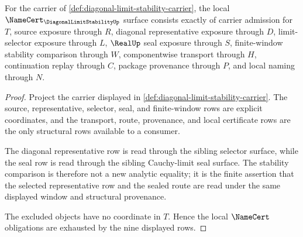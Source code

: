 \begin{theorem}
\label{thm:diagonal-limit-stability-namecert-obligations}
For the carrier of \autoref{def:diagonal-limit-stability-carrier}, the local $\NameCert_{\DiagonalLimitStabilityUp}$ surface consists exactly of carrier admission for $T$, source exposure through $R$, diagonal representative exposure through $D$, limit-selector exposure through $L$, $\RealUp$ seal exposure through $S$, finite-window stability comparison through $W$, componentwise transport through $H$, continuation replay through $C$, package provenance through $P$, and local naming through $N$.
\end{theorem}
\begin{proof}
Project the carrier displayed in \autoref{def:diagonal-limit-stability-carrier}. The source, representative, selector, seal, and finite-window rows are explicit coordinates, and the transport, route, provenance, and local certificate rows are the only structural rows available to a consumer.

The diagonal representative row is read through the sibling selector surface, while the seal row is read through the sibling Cauchy-limit seal surface. The stability comparison is therefore not a new analytic equality; it is the finite assertion that the selected representative row and the sealed route are read under the same displayed window and structural provenance.

The excluded objects have no coordinate in $T$. Hence the local $\NameCert$ obligations are exhausted by the nine displayed rows.
\end{proof}

